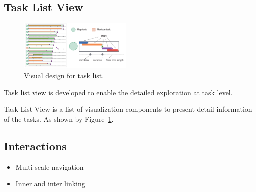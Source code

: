 \subsection{Task List View}


\begin{figure}[t]
	\centering
	\includegraphics[width=0.48\textwidth]{figures/visualization/taskList.pdf}
	\vspace{-3mm}
	\caption{Visual design for task list.}
	\label{fig:taskList}
	\vspace{-3mm}
\end{figure}

Task list view is developed to enable the detailed exploration at task level. 

Task List View is a list of visualization components to present detail information of the tasks. 
As shown by Figure~\ref{fig:taskList}.




\subsection{Interactions}
\begin{itemize}
    \item Multi-scale navigation
    \item Inner and inter linking
\end{itemize}
